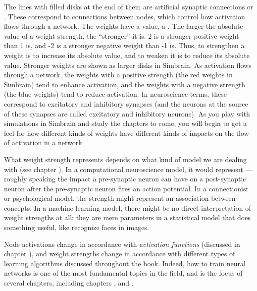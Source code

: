 
The lines with filled disks at the end of them are artificial synaptic connections or . These correspond to connections between nodes, which control how activation flows through a network. The weights have a value, a . The larger the absolute value of a weight strength, the ``stronger'' it is.  2 is a stronger positive weight than 1 is, and -2 is a stronger negative weight than -1 is. Thus, to strengthen a weight is to increase its absolute value, and to weaken it is to reduce its absolute value.  Stronger weights are shown as larger disks in Simbrain. As activation flows through a network, the weights with a positive strength (the red weights in Simbrain) tend to enhance activation, and the weights with a negative strength (the blue weights) tend to reduce activation. In neuroscience terms, these correspond to excitatory and inhibitory synapses (and the neurons at the source of these synapses are called excitatory and inhibitory neurons). As you play with simulations in Simbrain and study the chapters to come, you will begin to get a feel for how different kinds of weights have different kinds of impacts on the flow of activation in a network.

What weight strength represents depends on what kind of model we are dealing with (see chapter ). In a computational neuroscience model, it would represent ---roughly speaking the impact a pre-synaptic neuron can have on a post-synaptic neuron after the pre-synaptic neuron fires an action potential. In a connectionist or psychological model, the strength might represent an association between concepts. In a machine learning model, there might be no direct interpretation of weight strengths at all: they are mere parameters in a statistical model that does something useful, like recognize faces in images.

Node activations change in accordance with \emph{activation functions} (discussed in chapter ), and weight strengths change in accordance with different types of learning algorithms discussed throughout the book. Indeed, how to train neural networks is one of the most fundamental topics in the field, and is the focus of several chapters, including chapters ,  and . 

